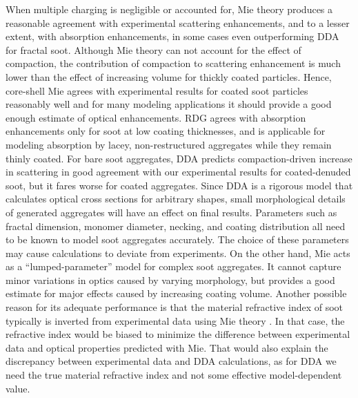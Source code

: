 When multiple charging is negligible or accounted for, Mie theory produces a reasonable agreement with experimental scattering enhancements, and to a lesser extent, with absorption enhancements, in some cases even outperforming DDA for fractal soot. Although Mie theory can not account for the effect of compaction, the contribution of compaction to scattering enhancement is much lower than the effect of increasing volume for thickly coated particles. Hence, core-shell Mie agrees with experimental results for coated soot particles reasonably well and for many modeling applications it should provide a good enough estimate of optical enhancements. RDG agrees with absorption enhancements only for soot at low coating thicknesses, and is applicable for modeling absorption by lacey, non-restructured aggregates while they remain thinly coated. For bare soot aggregates, DDA predicts compaction-driven increase in scattering in good agreement with our experimental results for coated-denuded soot, but it fares worse for coated aggregates. Since DDA is a rigorous model that calculates optical cross sections for arbitrary shapes, small morphological details of generated aggregates will have an effect on final results. Parameters such as fractal dimension, monomer diameter, necking, and coating distribution all need to be known to model soot aggregates accurately. The choice of these parameters may cause calculations to deviate from experiments. On the other hand, Mie acts as a ``lumped-parameter'' model for complex soot aggregates. It cannot capture minor variations in optics caused by varying morphology, but provides a good estimate for major effects caused by increasing coating volume. Another possible reason for its adequate performance is that the material refractive index of soot typically is inverted from experimental data using Mie theory \citep{RN23}. In that case, the refractive index would be biased to minimize the difference between experimental data and optical properties predicted with Mie. That would also explain the discrepancy between experimental data and DDA calculations, as for DDA we need the true material refractive index and not some effective model-dependent value. 

